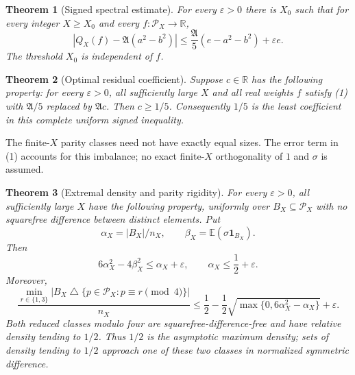 \documentclass[11pt]{article}
\newtheorem{theorem}{Theorem}
\newcommand{\Pcal}{\mathcal P}
\newcommand{\E}{\mathbb E}
\newcommand{\Aconst}{\mathfrak A}
\begin{document}
\begin{theorem}[Signed spectral estimate]\label{target:spectrum}
For every \(\varepsilon>0\) there is \(X_0\) such that for every
integer \(X\ge X_0\) and every \(f:\Pcal_X\to\mathbb R\),
\[
 \left|Q_X(f)-\Aconst(a^2-b^2)\right|
 \le \frac{\Aconst}{5}(e-a^2-b^2)+\varepsilon e.       \tag{1}
\]
The threshold \(X_0\) is independent of \(f\).
\end{theorem}

\begin{theorem}[Optimal residual coefficient]\label{thm:sharp}
Suppose \(c\in\mathbb R\) has the following property: for every
\(\varepsilon>0\), all sufficiently large \(X\) and all real weights \(f\)
satisfy (1) with \(\Aconst/5\) replaced by \(\Aconst c\).
Then \(c\ge1/5\). Consequently \(1/5\) is the least coefficient
in this complete uniform signed inequality.
\end{theorem}

The finite-\(X\) parity classes need not have exactly equal sizes.
The error term in (1) accounts for this imbalance;
no exact finite-\(X\) orthogonality of \(1\) and \(\sigma\) is assumed.

\begin{theorem}[Extremal density and parity rigidity]\label{thm:stability}
For every \(\varepsilon>0\), all sufficiently large \(X\) have the
following property, uniformly over \(B_X\subseteq\Pcal_X\) with no
squarefree difference between distinct elements. Put
\[
 \alpha_X=|B_X|/n_X,\qquad
 \beta_X=\E(\sigma\mathbf1_{B_X}).
\]
Then
\[
 6\alpha_X^2-4\beta_X^2\le\alpha_X+\varepsilon,
 \qquad \alpha_X\le\frac12+\varepsilon.              \tag{2}
\]
Moreover,
\[
 \frac{\min_{r\in\{1,3\}}|B_X\mathbin\triangle
       \{p\in\Pcal_X:p\equiv r\pmod4\}|}{n_X}
 \le \frac12-\frac12\sqrt{\max\{0,6\alpha_X^2-\alpha_X\}}
       +\varepsilon.                               \tag{3}
\]
Both reduced classes modulo four are squarefree-difference-free and have
relative density tending to \(1/2\). Thus \(1/2\) is the asymptotic
maximum density; sets of density tending to \(1/2\) approach one of
these two classes in normalized symmetric difference.
\end{theorem}
\end{document}
